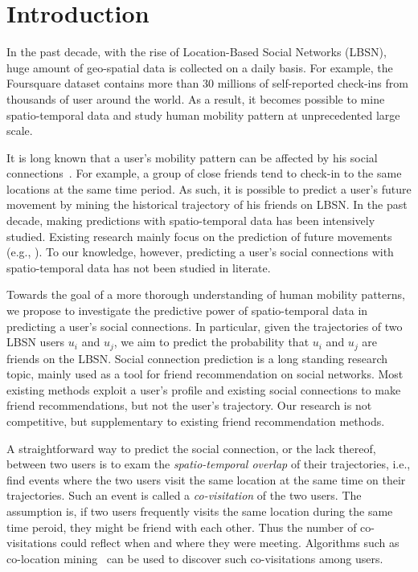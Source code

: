 \section{Introduction}\label{sec:intro}

In the past decade, with the rise of Location-Based Social Networks (LBSN), huge amount of geo-spatial data is collected on a daily basis. For example, the Foursquare\cite{yang2015nationtelescope} dataset contains more than 30 millions of self-reported check-ins from thousands of user around the world. As a result, it becomes possible to mine spatio-temporal data and study human mobility pattern at unprecedented large scale. 

It is long known that a user's mobility pattern can be affected by his social connections~\cite{cho2011friendship, ye2013s}. For example, a group of close friends tend to check-in to the same locations at the same time period. As such, it is possible to predict a user's future movement by mining the historical trajectory of his friends on LBSN. In the past decade, making predictions with spatio-temporal data has been intensively studied. Existing research mainly focus on the prediction of future movements (e.g., \cite{cho2011friendship, noulas2012mining, gao2012mobile, scellato2011nextplace, lian2013collaborative}). To our knowledge, however, predicting a user's social connections with spatio-temporal data has not been studied in literate. 

Towards the goal of a more thorough understanding of human mobility patterns, we propose to investigate the predictive power of spatio-temporal data in predicting a user's social connections. In particular, given the trajectories of two LBSN users $u_i$ and $u_j$, we aim to predict the probability that $u_i$ and $u_j$ are friends on the LBSN. Social connection prediction is a long standing research topic, mainly used as a tool for friend recommendation on social networks. Most existing methods exploit a user's profile and existing social connections to make friend recommendations, but not the user's trajectory. Our research is not competitive, but supplementary to existing friend recommendation methods.

A straightforward way to predict the social connection, or the lack thereof, between two users is to exam the \textit{spatio-temporal overlap} of their trajectories, i.e., find events where the two users visit the same location at the same time on their trajectories. Such an event is called a \textit{co-visitation} of the two users. The assumption is, if two users frequently visits the same location during the same time peroid, they might be friend with each other. Thus the number of co-visitations could reflect when and where they were meeting. Algorithms such as co-location mining~\cite{weiler2015geo} can be used to discover such co-visitations among users.

